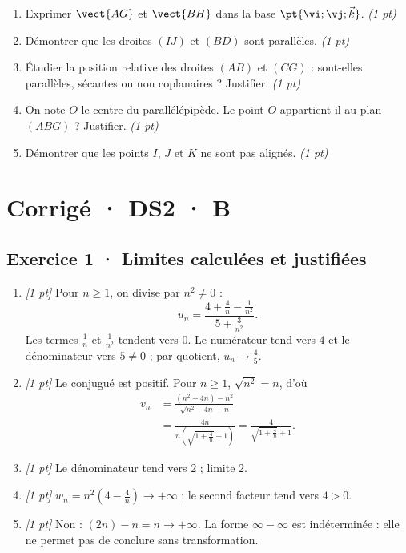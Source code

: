 \begin{enumerate}

\item Exprimer $\vect{AG}$ et $\vect{BH}$ dans la base $\pt{\vi;\vj;\vec k}$. \hfill\textit{(1 pt)}

\item Démontrer que les droites $(IJ)$ et $(BD)$ sont parallèles. \hfill\textit{(1 pt)}

\item Étudier la position relative des droites $(AB)$ et $(CG)$ : sont-elles parallèles, sécantes ou non coplanaires ? Justifier. \hfill\textit{(1 pt)}

\item On note $O$ le centre du parallélépipède. Le point $O$ appartient-il au plan $(ABG)$ ? Justifier. \hfill\textit{(1 pt)}

\item Démontrer que les points $I$, $J$ et $K$ ne sont pas alignés. \hfill\textit{(1 pt)}

\end{enumerate}

\ifmxteacher\mxnewpage

\section*{Corrigé · DS2 · B}\label{cor:2-4}

\subsection*{Exercice 1 · Limites calculées et justifiées}\begin{enumerate}

\item \textit{[1 pt]} Pour $n\ge1$, on divise par $n^2\ne0$ :
\[u_n=\frac{4+\frac{4}{n}-\frac{1}{n^2}}{5+\frac{3}{n^2}}.\]
Les termes $\frac{1}{n}$ et $\frac{1}{n^2}$ tendent vers $0$. Le numérateur tend vers $4$ et le dénominateur vers $5\ne0$ ; par quotient, $u_n\to\frac{4}{5}$.

\item \textit{[1 pt]} Le conjugué est positif. Pour $n\ge1$, $\sqrt{n^2}=n$, d'où
\[\begin{aligned}v_n&=\frac{(n^2+4n)-n^2}{\sqrt{n^2+4n}+n}\\&=\frac{4n}{n(\sqrt{1+\frac{4}{n}}+1)}=\frac{4}{\sqrt{1+\frac{4}{n}}+1}.\end{aligned}\]

\item \textit{[1 pt]} Le dénominateur tend vers $2$ ; limite $2$.

\item \textit{[1 pt]} $w_n=n^2(4-\frac{4}{n})\to+\infty$ ; le second facteur tend vers $4>0$.

\item \textit{[1 pt]} Non : $(2n)-n=n\to+\infty$. La forme $\infty-\infty$ est indéterminée : elle ne permet pas de conclure sans transformation.

\end{enumerate}

